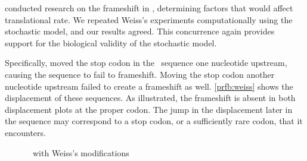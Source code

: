 \documentclass[12pt, draft]{article}
\numberwithin{equation}{section}
\begin{document}
\citet{weiss87,weiss88} conducted research on the
frameshift in \prfB, determining factors that would affect
translational rate.  We repeated Weiss's experiments computationally
using the stochastic model, and our results agreed.
This concurrence again provides support for the biological validity of
the stochastic model.

Specifically, \citeauthor{weiss87} moved the stop codon in the
\prfB\ sequence one nucleotide upstream, causing the sequence to fail to
frameshift. Moving the stop codon another nucleotide upstream failed
to create a frameshift as well. \autoref{prfb:weiss}
shows the displacement of these sequences.  As illustrated,
the frameshift is absent in both displacement plots at the proper codon.
The jump in the displacement later in the sequence may correspond to a
stop codon, or a sufficiently rare codon, that it encounters.

\begin{figure}
    \centering
    \caption{\prfB\ with Weiss's modifications}
    \label{prfb:weiss}
\end{figure}
\end{document}
